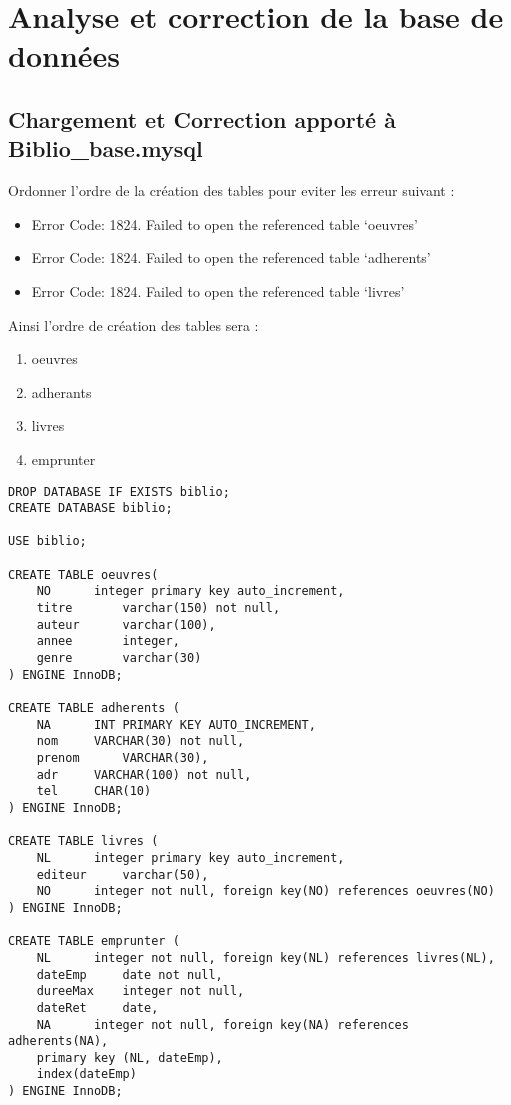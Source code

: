 \documentclass[11]{article}
\begin{document}
\section{Analyse et correction de la base de données}

\subsection{Chargement et Correction apporté à Biblio\_base.mysql}

Ordonner l'ordre de la création des tables pour eviter les erreur
suivant :

\begin{itemize}
	\item Error Code: 1824. Failed to open the referenced table `oeuvres'
	\item Error Code: 1824. Failed to open the referenced table `adherents'
	\item Error Code: 1824. Failed to open the referenced table `livres'
\end{itemize}


Ainsi l'ordre de création des tables sera :
\begin{enumerate}
	\item oeuvres
	\item adherants
	\item livres
	\item emprunter
\end{enumerate}

\begin{verbatim}
DROP DATABASE IF EXISTS biblio;
CREATE DATABASE biblio;

USE biblio;

CREATE TABLE oeuvres(
	NO 		integer primary key auto_increment,
	titre 		varchar(150) not null,
	auteur 		varchar(100),
	annee		integer,
	genre		varchar(30)
) ENGINE InnoDB;

CREATE TABLE adherents (
	NA		INT PRIMARY KEY AUTO_INCREMENT,
	nom		VARCHAR(30) not null,
	prenom		VARCHAR(30),
	adr		VARCHAR(100) not null,
	tel		CHAR(10)
) ENGINE InnoDB;

CREATE TABLE livres (
	NL		integer primary key auto_increment,
	editeur		varchar(50),
	NO		integer not null, foreign key(NO) references oeuvres(NO)
) ENGINE InnoDB;

CREATE TABLE emprunter (
	NL		integer not null, foreign key(NL) references livres(NL),
	dateEmp		date not null,
	dureeMax	integer not null,
	dateRet 	date,
	NA		integer not null, foreign key(NA) references adherents(NA),
	primary key (NL, dateEmp),
	index(dateEmp)
) ENGINE InnoDB;
\end{verbatim}
\end{document}
